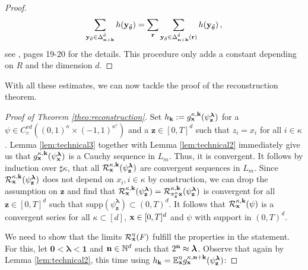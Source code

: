 \documentclass[12pt]{article}
\numberwithin{equation}{section}
\theoremstyle{plain}
\theoremstyle{definition}
\def\bE{\mathbb{E}}\def\bW{\mathbb{W}}
\def\fk{\mathbf k}\def\fl{\mathbf l}
\def\fy{\mathbf y}\def\fz{\mathbf z}
\def\flambda{{\boldsymbol\lambda}}
\def\foo{{\boldsymbol 0}}
\def\fone{{\boldsymbol 1}}
\def\supp{\mbox{supp}}
\begin{document}
\begin{proof}
    \[
        \sum_{\fy_{\tilde\theta}\in\Delta_{\fn+\fk}^{\tilde\theta}} h(\fy_{\tilde\theta}) = \sum_{\fr}\sum_{\fy_{\tilde\theta}\in\Delta_{\fn+\fk}^{\tilde\theta}(\fr)} h(\fy_{\tilde\theta})\,,
    \]
    see \cite{kern2021}, pages 19-20 for the details. This procedure only adds a constant depending on $R$ and the dimension $d$. 
\end{proof}

 With all these estimates, we can now tackle the proof of the reconstruction theorem.

\begin{proof}[Proof of Theorem \ref{theo:reconstruction}]
Set $h_{\fk} := g^{\kappa,\fk}_\fx(\psi_{\fz}^{\flambda})$ for a $\psi\in C_c^{rd}((0,1)^\kappa\times(-1,1)^{\kappa^c})$ and a $\fz\in[0,T]^d$ such that $z_i = x_i$ for all $i\in\kappa$. Lemma \ref{lem:technical3} together with Lemma \ref{lem:technical2} immediately give us that $g^{\kappa,\fk}_\fx(\psi_\fx^{\flambda})$ is a Cauchy sequence in $L_m$. Thus, it is convergent. It follows by induction over $\sharp\kappa$, that all $\mathcal{R}^{\kappa,\fk}_\fx(\psi_\fz^\flambda)$ are convergent sequences in $L_m$. Since $\mathcal{R}^{\kappa,\fk}_\fx(\psi_\fz^\flambda)$ does not depend on $x_i, i\in\kappa$ by construction, we can drop the assumption on $\fz$ and find that $\mathcal{R}^{\kappa,\fk}_\fx(\psi_\fz^\flambda) = \mathcal{R}^{\kappa,\fk}_{\pi_\fz^\kappa\fx}(\psi_\fz^\flambda)$ is convergent for all $\fz\in[0,T]^d$ such that $\supp(\psi_\fz^\flambda)\subset (0,T)^d$. It follows that $\mathcal{R}^{\kappa,\fk}_\fx(\psi)$ is a convergent series for all $\kappa\subset[d]$, $ \mathbf x\in[0,T]^d$ and $\psi$ with support in $(0,T)^d$.

    We need to show that the limits $\mathcal{R}^\eta_\mathbf x(F)$ fulfill the properties in the statement. For this, let $\foo<\flambda<\fone$ and $\mathbf n\in\mathbb{N}^d$ such that $2^{\fn} \approx \flambda$. Observe that again by Lemma \ref{lem:technical2}, this time using $h_{\fk} = \bE^\eta_\fx g^{\kappa,\fn+\fk}_\fx(\psi_\fz^{\flambda})$:


\end{proof}
\end{document}
